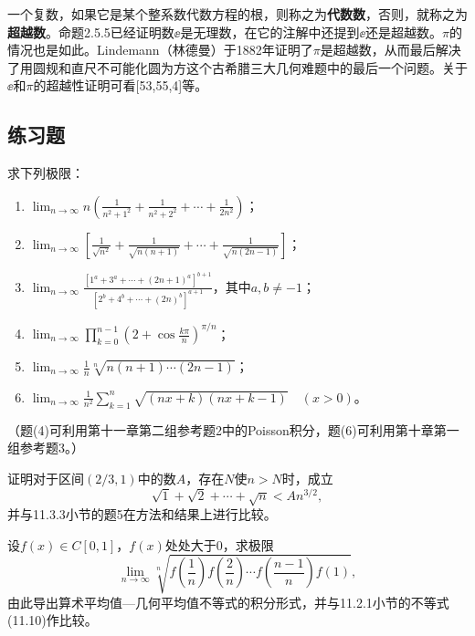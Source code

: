 一个复数，如果它是某个整系数代数方程的根，则称之为\textbf{代数数}，否则，就称之为\textbf{超越数}。命题2.5.5已经证明数$\ee$是无理数，在它的注解中还提到$\ee$还是超越数。$\pi$的情况也是如此。Lindemann（林德曼）于1882年证明了$\pi$是超越数，从而最后解决了用圆规和直尺不可能化圆为方这个古希腊三大几何难题中的最后一个问题。关于$\ee$和$\pi$的超越性证明可看[53,55,4]等。

\subsection{练习题}

\begin{xexercise}[1]
求下列极限：
  \begin{enumerate}[label=(\arabic*)]
    \item $\displaystyle\lim_{n\to\infty}n\left(\frac1{n^2+1^2}+\frac1{n^2+2^2}+\cdots+\frac1{2n^2}\right)$；
    \item $\displaystyle\lim_{n\to\infty}\left[\frac1{\sqrt{n^2}}+\frac1{\sqrt{n(n+1)}}+\cdots+\frac1{\sqrt{n(2n-1)}}\right]$；
    \item $\displaystyle\lim_{n\to\infty}\frac{[1^a+3^a+\cdots+(2n+1)^a]^{b+1}}{[2^b+4^b+\cdots+(2n)^b]^{a+1}}$，其中$a,b\ne-1$；
    \item $\displaystyle\lim_{n\to\infty}\prod_{k=0}^{n-1}\left(2+\cos\frac{k\pi}{n}\right)^{\pi/n}$；
    \item $\displaystyle\lim_{n\to\infty}\frac1n\sqrt[n]{n(n+1)\cdots(2n-1)}$；
    \item $\displaystyle\lim_{n\to\infty}\frac1{n^2}\sum_{k=1}^n\sqrt{(nx+k)(nx+k-1)}\quad(x>0)$。
  \end{enumerate}
  （题(4)可利用第十一章第二组参考题2中的Poisson积分，题(6)可利用第十章第一组参考题3。）
\end{xexercise}

\begin{xexercise}[2]
证明对于区间$(2/3,1)$中的数$A$，存在$N$使$n>N$时，成立
  \[
    \sqrt1+\sqrt2+\cdots+\sqrt n<An^{3/2},
  \]
  并与11.3.3小节的题5在方法和结果上进行比较。
\end{xexercise}

\begin{xexercise}[3]
设$f(x)\in C[0,1]$，$f(x)$处处大于0，求极限
  \[
    \lim_{n\to\infty}\sqrt[n]{f\left(\frac1n\right)f\left(\frac2n\right)\cdots f\left(\frac{n-1}{n}\right)f(1)},
  \]
  由此导出算术平均值—几何平均值不等式的积分形式，并与11.2.1小节的不等式(11.10)作比较。
\end{xexercise}

